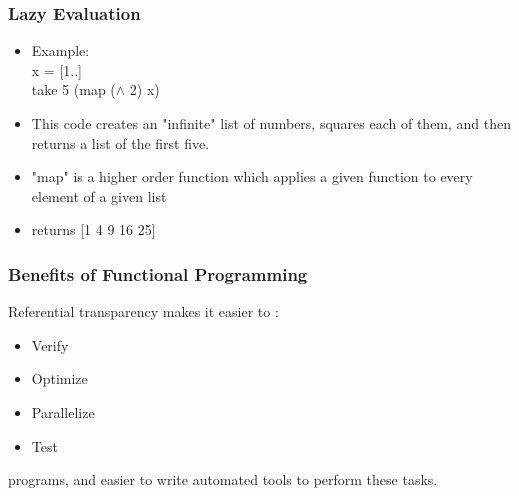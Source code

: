 \documentclass[presentation.tex]{subfiles}
\begin{document}
\begin{frame}
  \frametitle{Lazy Evaluation}
    	\begin{itemize}
 \item Example: \\ \;
  x = [1..] \\
  take 5 (map ($\wedge$ 2) x) \\
 \item This code creates an "infinite" list of numbers, squares each of them, and then returns a list of the first five. \\
 \item "map" is a higher order function which applies a given function to every element of a given list
\item returns [1 4 9 16 25]
	  \end{itemize} 
\end{frame}  

\begin{frame}
  \frametitle{Benefits of Functional Programming}
  Referential transparency makes it easier to :
    	\begin{itemize}
 \item Verify  
 \item Optimize
 \item Parallelize 
 \item Test

	  \end{itemize} 
	  programs, and easier to write automated tools to perform these tasks.  
\end{frame}  
\end{document}
